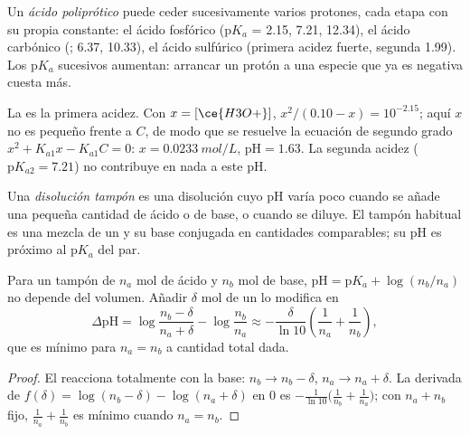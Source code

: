 \begin{definition}\label{def:b1:predominant-reaction:polyprotic}
Un \emph{ácido poliprótico} puede ceder
sucesivamente varios protones, cada etapa con su propia constante: el
ácido fosfórico  ($\mathrm{p}K_a$ = 2.15, 7.21, 12.34), el
ácido carbónico (; 6.37, 10.33), el ácido sulfúrico (primera
acidez fuerte, segunda 1.99). Los $\mathrm{p}K_a$ sucesivos aumentan:
arrancar un protón a una especie que ya es negativa cuesta más.
\end{definition}

\begin{example}\label{ex:b1:predominant-reaction:h3po4}
La  es la primera acidez. Con $x = [\ce{H3O+}]$,
$x^2/(0.10 - x) = 10^{-2.15}$; aquí $x$ no es pequeño frente a $C$, de
modo que se resuelve la ecuación de segundo grado
$x^2 + K_{a1}x - K_{a1}C = 0$: $x =
\qty{0.0233}{mol/L}$, $\mathrm{pH} = 1.63$. La segunda acidez
($\mathrm{p}K_{a2} = 7.21$) no contribuye en nada a este pH.
\end{example}

\begin{definition}\label{def:b1:predominant-reaction:buffer}
Una \emph{disolución tampón} es una disolución cuyo
pH varía poco cuando se añade una pequeña cantidad de ácido o de base, o
cuando se diluye. El tampón habitual es una mezcla de un  y su
base conjugada en cantidades comparables; su pH es próximo al
$\mathrm{p}K_a$ del par.
\end{definition}

\begin{proposition}\label{prop:b1:predominant-reaction:buffer}
Para un tampón de $n_a$ mol de ácido y $n_b$ mol de base,
$\mathrm{pH} =
\mathrm{p}K_a + \log(n_b/n_a)$ no depende del volumen. Añadir $\delta$
mol de un  lo modifica en
\[
  \Delta\mathrm{pH} = \log\frac{n_b - \delta}{n_a + \delta} - \log\frac{n_b}{n_a}
  \approx -\frac{\delta}{\ln 10}\left(\frac{1}{n_a} + \frac{1}{n_b}\right),
\]
que es mínimo para $n_a = n_b$ a cantidad total dada.
\end{proposition}

\begin{proof}
El  reacciona totalmente con la base: $n_b \to n_b - \delta$,
$n_a \to n_a + \delta$. La derivada de $f(\delta) = \log(n_b - \delta) -
\log(n_a + \delta)$ en 0 es $-\frac{1}{\ln10}\big(\frac{1}{n_b} +
\frac{1}{n_a}\big)$; con $n_a + n_b$ fijo, $\frac1{n_a} + \frac1{n_b}$ es
mínimo cuando $n_a = n_b$.
\end{proof}

